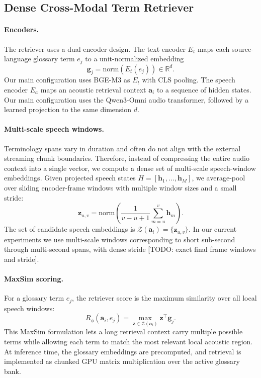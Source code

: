 \subsection{Dense Cross-Modal Term Retriever}
\label{sec:retriever}

\paragraph{Encoders.}
The retriever uses a dual-encoder design.  The text encoder $E_t$ maps each source-language glossary term $e_j$ to a unit-normalized embedding
\begin{equation}
  \mathbf{g}_j = \mathrm{norm}(E_t(e_j)) \in \mathbb{R}^{d}.
\end{equation}
Our main configuration uses BGE-M3 as $E_t$ with CLS pooling.  The speech encoder $E_a$ maps an acoustic retrieval context $\mathbf{a}_i$ to a sequence of hidden states.  Our main configuration uses the Qwen3-Omni audio transformer, followed by a learned projection to the same dimension $d$.

\paragraph{Multi-scale speech windows.}
Terminology spans vary in duration and often do not align with the external streaming chunk boundaries.  Therefore, instead of compressing the entire audio context into a single vector, we compute a dense set of multi-scale speech-window embeddings.  Given projected speech states $H=[\mathbf{h}_1,\ldots,\mathbf{h}_M]$, we average-pool over sliding encoder-frame windows with multiple window sizes and a small stride:
\begin{equation}
  \mathbf{z}_{u,v}
  =
  \mathrm{norm}\left(
    \frac{1}{v-u+1}\sum_{m=u}^{v}\mathbf{h}_m
  \right).
\end{equation}
The set of candidate speech embeddings is $\mathcal{Z}(\mathbf{a}_i)=\{\mathbf{z}_{u,v}\}$.  In our current experiments we use multi-scale windows corresponding to short sub-second through multi-second spans, with dense stride [TODO: exact final frame windows and stride].

\paragraph{MaxSim scoring.}
For a glossary term $e_j$, the retriever score is the maximum similarity over all local speech windows:
\begin{equation}
  R_\phi(\mathbf{a}_i,e_j)
  =
  \max_{\mathbf{z}\in\mathcal{Z}(\mathbf{a}_i)}
  \mathbf{z}^{\top}\mathbf{g}_j.
\end{equation}
This MaxSim formulation lets a long retrieval context carry multiple possible terms while allowing each term to match the most relevant local acoustic region.  At inference time, the glossary embeddings are precomputed, and retrieval is implemented as chunked GPU matrix multiplication over the active glossary bank.

